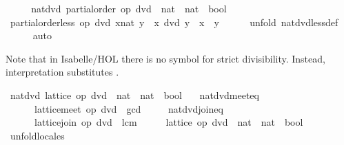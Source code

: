 \begin{isabellebody}
\ \ \isamarkupfalse%
\ \isamarkupfalse%
\ nat{\isacharunderscore}dvd{\isacharcolon}\ partial{\isacharunderscore}order\ {\isachardoublequoteopen}op\ dvd\ {\isacharcolon}{\isacharcolon}\ nat\ {\isasymRightarrow}\ nat\ {\isasymRightarrow}\ bool{\isachardoublequoteclose}\ \isacommand{{\isachardot}}\isamarkupfalse%
\isanewline
\ \ \isamarkupfalse%
\ {\isachardoublequoteopen}partial{\isacharunderscore}order{\isachardot}less\ op\ dvd\ {\isacharparenleft}x{\isacharcolon}{\isacharcolon}nat{\isacharparenright}\ y\ {\isacharequal}\ {\isacharparenleft}x\ dvd\ y\ {\isasymand}\ x\ {\isasymnoteq}\ y{\isacharparenright}{\isachardoublequoteclose}\isanewline
\ \ \ \ \isamarkupfalse%
\ {\isacharparenleft}unfold\ nat{\isacharunderscore}dvd{\isachardot}less{\isacharunderscore}def{\isacharparenright}\isanewline
\ \ \ \ \isamarkupfalse%
\ auto\isanewline
\ \ \ \ \isamarkupfalse%
\isanewline
{}\isamarkupfalse%
%
\endisatagproof
{\isafoldproof}%
%
\isadelimproof
%
\endisadelimproof
%
\begin{isamarkuptext}%
Note that in Isabelle/HOL there is no symbol for strict
  divisibility.  Instead, interpretation substitutes .%
\end{isamarkuptext}%
\isamarkuptrue%
\isamarkupfalse%
\ nat{\isacharunderscore}dvd{\isacharcolon}\ lattice\ {\isachardoublequoteopen}op\ dvd\ {\isacharcolon}{\isacharcolon}\ nat\ {\isasymRightarrow}\ nat\ {\isasymRightarrow}\ bool{\isachardoublequoteclose}\isanewline
\ \ \ nat{\isacharunderscore}dvd{\isacharunderscore}meet{\isacharunderscore}eq{\isacharcolon}\isanewline
\ \ \ \ \ \ {\isachardoublequoteopen}lattice{\isachardot}meet\ op\ dvd\ {\isacharequal}\ gcd{\isachardoublequoteclose}\isanewline
\ \ \ \ \ nat{\isacharunderscore}dvd{\isacharunderscore}join{\isacharunderscore}eq{\isacharcolon}\isanewline
\ \ \ \ \ \ {\isachardoublequoteopen}lattice{\isachardot}join\ op\ dvd\ {\isacharequal}\ lcm{\isachardoublequoteclose}\isanewline
%
\isadelimproof
%
\endisadelimproof
%
\isatagproof
{}\isamarkupfalse%
\ {\isacharminus}\isanewline
\ \ \isamarkupfalse%
\ {\isachardoublequoteopen}lattice\ {\isacharparenleft}op\ dvd\ {\isacharcolon}{\isacharcolon}\ nat\ {\isasymRightarrow}\ nat\ {\isasymRightarrow}\ bool{\isacharparenright}{\isachardoublequoteclose}\isanewline
\ \ \ \ \isamarkupfalse%
\ unfold{\isacharunderscore}locales\isanewline

\end{isabellebody}
